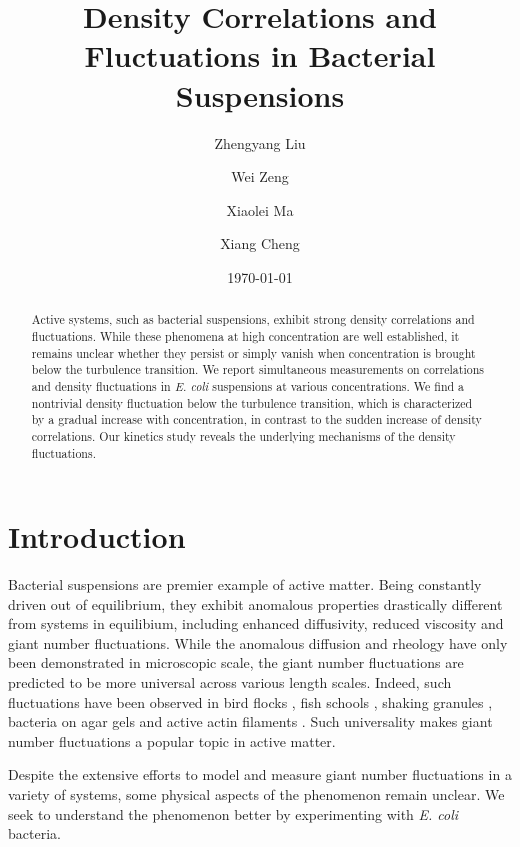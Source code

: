 \documentclass[twocolumn,aps,pre,amsmath,amssymb,floatfix,longbibliography]{revtex4-1}
\begin{document}
\title{Density Correlations and Fluctuations in Bacterial Suspensions}

\author{Zhengyang Liu}
\author{Wei Zeng}
\author{Xiaolei Ma}
\author{Xiang Cheng}



\date{\today}

\begin{abstract}
Active systems, such as bacterial suspensions, exhibit strong density correlations and  fluctuations. While these phenomena at high concentration are well established, it remains unclear whether they persist or simply vanish when concentration is brought below the turbulence transition. We report simultaneous measurements on correlations and density fluctuations in \textit{E. coli} suspensions at various concentrations. We find a nontrivial density fluctuation below the turbulence transition, which is characterized by a gradual increase with concentration, in contrast to the sudden increase of density correlations. Our kinetics study reveals the underlying mechanisms of the density fluctuations.
\end{abstract}

\maketitle
\section{Introduction}

Bacterial suspensions are premier example of active matter. Being constantly driven out of equilibrium, they exhibit anomalous properties drastically different from systems in equilibium, including enhanced diffusivity, reduced viscosity and giant number fluctuations. While the anomalous diffusion and rheology have only been demonstrated in microscopic scale, the giant number fluctuations are predicted to be more universal across various length scales. Indeed, such fluctuations have been observed in bird flocks \cite{Ballerini1232}, fish schools \cite{Ward6948}, shaking granules \cite{Narayan105}, bacteria on agar gels \cite{Zhang13626} and active actin filaments \cite{Schaller4488}. Such universality makes giant number fluctuations a popular topic in active matter.

Despite the extensive efforts to model and measure giant number fluctuations in a variety of systems, some physical aspects of the phenomenon remain unclear. We seek to understand the phenomenon better by experimenting with \textit{E. coli} bacteria.
\end{document}
